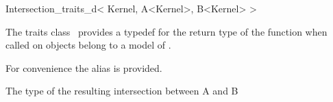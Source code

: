 \begin{ccRefClass}{Intersection_traits_d< Kernel, A<Kernel>, B<Kernel> >}


\ccDefinition

The traits class \ccClassTemplateName\ provides a typedef for the
return type of the  function when called on objects
belong to a model of .

For convenience the alias  is provided.

\ccTypes

 The type of the resulting intersection between A and B
\end{ccRefClass}

